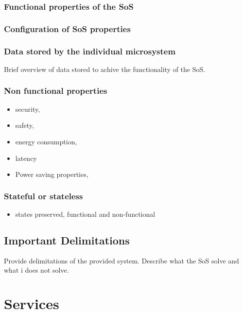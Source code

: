 \documentclass[a4paper]{arrowhead}
\begin{document}
\subsubsection {Functional properties of the SoS}

\subsubsection {Configuration of SoS properties}


\subsubsection {Data stored by the individual microsystem }
Brief overview of data stored to achive the functionality of the SoS. 

\subsubsection {Non functional properties}
\begin{itemize}
  \item security, 
  \item safety, 
  \item energy consumption,
  \item latency
  \item Power saving properties, 
\end{itemize}


\subsubsection {Stateful or stateless}
\begin{itemize} 
\item states preserved, functional and non-functional
\end{itemize}  
\color{black}  


\subsection{Important Delimitations}
\label{sec:delimitations}

\color{red}
Provide delimitations of the provided system. Describe what the SoS
solve and what i does not solve.
\color{black}  



\newpage

\section{Services}
\label{sec:services}
\end{document}
